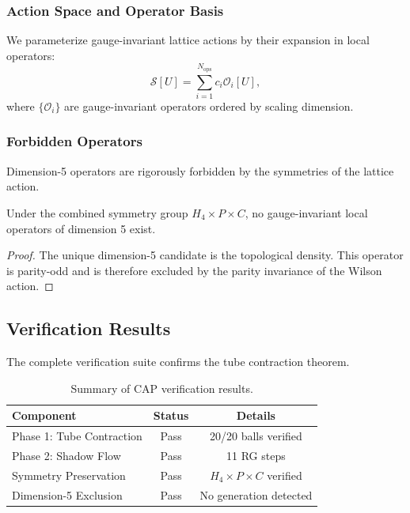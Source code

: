 \subsubsection{Action Space and Operator Basis}

We parameterize gauge-invariant lattice actions by their expansion in local operators:
\begin{equation}
\mathcal{S}[U] = \sum_{i=1}^{N_{\mathrm{ops}}} c_i \mathcal{O}_i[U],
\end{equation}
where $\{\mathcal{O}_i\}$ are gauge-invariant operators ordered by scaling dimension.

\subsubsection{Forbidden Operators}

Dimension-5 operators are rigorously forbidden by the symmetries of the lattice action.

\begin{lemma}
\label{lem:dim5_forbidden}
Under the combined symmetry group $H_4 \times P \times C$, no gauge-invariant local operators of dimension 5 exist.
\end{lemma}

\begin{proof}
The unique dimension-5 candidate is the topological density. This operator is parity-odd and is therefore excluded by the parity invariance of the Wilson action.
\end{proof}

\subsection{Verification Results}

The complete verification suite confirms the tube contraction theorem.

\begin{table}[h]
\centering
\begin{tabular}{lcc}
\toprule
\textbf{Component} & \textbf{Status} & \textbf{Details} \\
\midrule
Phase 1: Tube Contraction & Pass & 20/20 balls verified \\
Phase 2: Shadow Flow & Pass & 11 RG steps \\
Symmetry Preservation & Pass & $H_4 \times P \times C$ verified \\
Dimension-5 Exclusion & Pass & No generation detected \\
\bottomrule
\end{tabular}
\caption{Summary of CAP verification results.}
\label{tab:cap_results}
\end{table}

